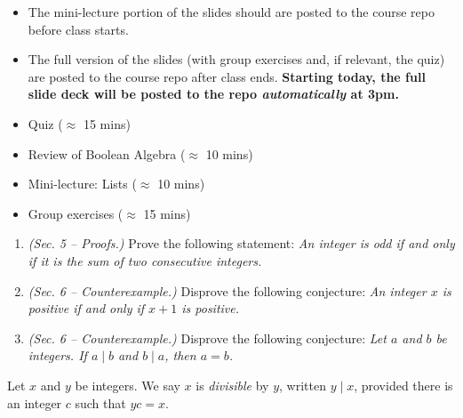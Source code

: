 \documentclass[dvipsnames, 10pt]{beamer}
\begin{document}
\begin{frame}

\vfill 
\begin{myredbox}[title=Announcements]
\begin{itemize}
	\item The mini-lecture portion of the slides should are posted to the course repo before class starts.
	\item The full version of the slides (with group exercises and, if relevant, the quiz) are posted to the course repo after class ends. \textbf{Starting today, the full slide deck will be posted to the repo \emph{automatically} at 3pm.}
\end{itemize}
\end{myredbox} 
\vfill 

\begin{myyellowbox}[title=Today's Agenda]
\begin{itemize}
	\item Quiz ($\approx$ 15 mins)
	\item Review of Boolean Algebra ($\approx$ 10 mins)
	\item Mini-lecture: Lists ($\approx$ 10 mins)
	\item Group exercises ($\approx$ 15 mins)
\end{itemize}

\end{myyellowbox}
\end{frame}


\begin{frame}
\small 
 \begin{myredbox}[title=Weekly Quiz \#2] 
\begin{enumerate}
	\item  \textit{(Sec. 5 -- Proofs.)}  Prove the following statement: \textit{An integer is odd if and only if it is the sum of two consecutive integers.}
	\item  \textit{(Sec. 6 -- Counterexample.)}  Disprove the following conjecture: \textit{An integer $x$ is positive if and only if $x + 1$ is positive.}
	\item  \textit{(Sec. 6 -- Counterexample.)}  Disprove the following conjecture: \textit{Let $a$ and $b$ be integers.  If $a \mid b$ and $b \mid a$, then $a=b$.}
\end{enumerate}
\end{myredbox}

\vfill 
\begin{mygreenbox}[title=Reference Material: Scheinerman Definition 3.2] Let $x$ and $y$ be integers.  We say $x$ is \textit{divisible} by $y$, written $y \mid x$, provided there is an integer $c$ such that $yc=x$. 	
\end{mygreenbox}


\end{frame}
\end{document}
